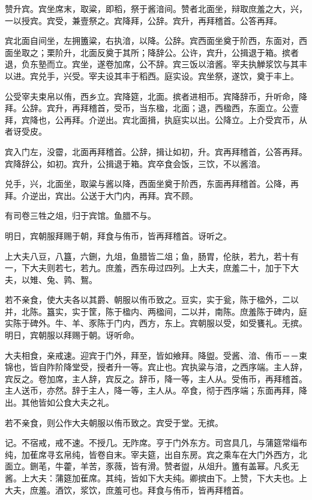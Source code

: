 \documentclass[]{article}
\begin{document}
赞升宾。宾坐席末，取粱，即稻，祭于酱湆间。赞者北面坐，辩取庶羞之大，兴，一以授宾。宾受，兼壹祭之。宾降拜，公辞。宾升，再拜稽首。公答再拜。

宾北面自间坐，左拥簠粱，右执湆，以降。公辞。宾西面坐奠于阶西，东面对，西面坐取之；栗阶升，北面反奠于其所；降辞公。公许，宾升，公揖退于箱。摈者退，负东塾而立。宾坐，遂卷加席，公不辞。宾三饭以湆酱。宰夫执觯浆饮与其丰以进。宾兑手，兴受。宰夫设其丰于稻西。庭实设。宾坐祭，遂饮，奠于丰上。

公受宰夫束帛以侑，西乡立。宾降筵，北面。摈者进相币。宾降辞币，升听命，降拜。公辞。宾升，再拜稽首，受币，当东楹，北面；退，西楹西，东面立。公壹拜，宾降也，公再拜。介逆出。宾北面揖，执庭实以出。公降立。上介受宾币，从者讶受皮。

宾入门左，没霤，北面再拜稽首。公辞，揖让如初，升。宾再拜稽首，公答再拜。宾降辞公，如初。宾升，公揖退于箱。宾卒食会饭，三饮，不以酱湆。

兑手，兴，北面坐，取粱与酱以降，西面坐奠于阶西，东面再拜稽首。公降，再拜。介逆出，宾出。公送于大门内，再拜。宾不顾。

有司卷三牲之俎，归于宾馆。鱼腊不与。

明日，宾朝服拜赐于朝，拜食与侑币，皆再拜稽首。讶听之。

上大夫八豆，八簋，六鉶，九俎，鱼腊皆二俎；鱼，肠胃，伦肤，若九，若十有一，下大夫则若七，若九。庶羞，西东毋过四列。上大夫，庶羞二十，加于下大夫，以雉、兔、鹑、鴽。

若不亲食，使大夫各以其爵、朝服以侑币致之。豆实，实于瓮，陈于楹外，二以并，北陈。簋实，实于筐，陈于楹内、两楹间，二以并，南陈。庶羞陈于碑内，庭实陈于碑外。牛、羊、豕陈于门内，西方，东上。宾朝服以受，如受饔礼。无摈。明日，宾朝服以拜赐于朝。讶听命。

大夫相食，亲戒速。迎宾于门外，拜至，皆如飨拜。降盥。受酱、湆、侑币－－束锦也，皆自阼阶降堂受，授者升一等。宾止也。宾执粱与湆，之西序端。主人辞，宾反之。卷加席，主人辞，宾反之。辞币，降一等，主人从。受侑币，再拜稽首。主人送币，亦然。辞于主人，降一等，主人从。卒食，彻于西序端；东面再拜，降出。其他皆如公食大夫之礼。

若不亲食，则公作大夫朝服以侑币致之。宾受于堂。无摈。

记。不宿戒，戒不速。不授几。无阼席。亨于门外东方。司宫具几，与蒲筵常缁布纯，加萑席寻玄帛纯，皆卷自末。宰夫筵，出自东房。宾之乘车在大门外西方，北面立。鉶芼，牛藿，羊苦，豕薇，皆有滑。赞者盥，从俎升。簠有盖幂。凡炙无酱。上大夫：蒲筵加萑席。其纯，皆如下大夫纯。卿摈由下。上赞，下大夫也。上大夫，庶羞。酒饮，浆饮，庶羞可也。拜食与侑币，皆再拜稽首。
\end{document}
